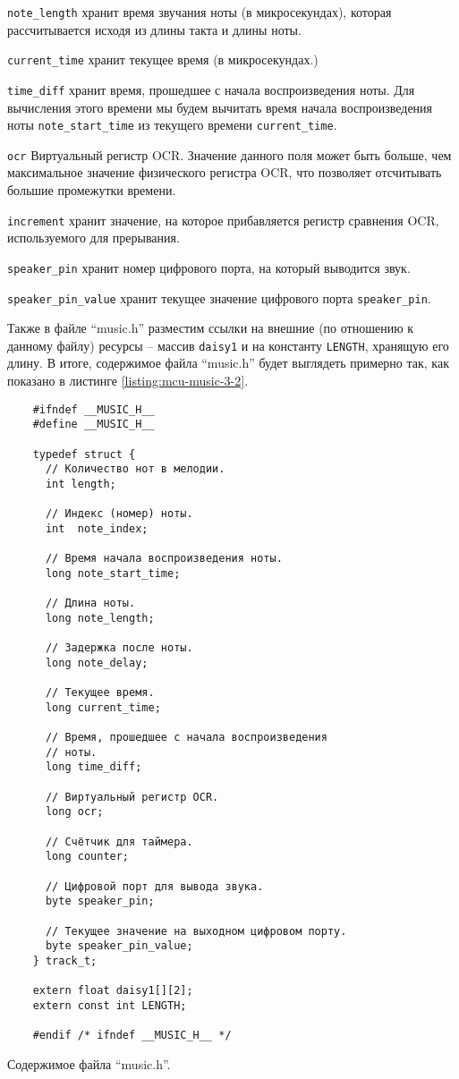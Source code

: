 \documentclass[../sparc.tex]{subfiles}
\begin{document}
\texttt{note_length} хранит время звучания ноты (в микросекундах),
которая рассчитывается исходя из длины такта и длины ноты.

\texttt{current_time} хранит текущее время (в микросекундах.)

\texttt{time_diff} хранит время, прошедшее с начала воспроизведения
ноты.  Для вычисления этого времени мы будем вычитать время начала
воспроизведения ноты \texttt{note_start_time} из текущего времени
\texttt{current_time}.

\texttt{ocr} Виртуальный регистр OCR.  Значение данного поля может быть
больше, чем максимальное значение физического регистра OCR, что позволяет
отсчитывать большие промежутки времени.

\texttt{increment} хранит значение, на которое прибавляется регистр
сравнения OCR, используемого для прерывания.

\texttt{speaker_pin} хранит номер цифрового порта, на который выводится
звук.

\texttt{speaker_pin_value} хранит текущее значение цифрового порта
\texttt{speaker_pin}.

Также в файле ``music.h'' разместим ссылки на внешние (по отношению к данному
файлу) ресурсы -- массив \texttt{daisy1} и на константу
\texttt{LENGTH}, хранящую его длину.  В итоге, содержимое файла
``music.h'' будет выглядеть примерно так, как показано в листинге
\ref{listing:mcu-music-3-2}.

\newpage
\begin{listing}[H]
  \begin{verbatim}
    #ifndef __MUSIC_H__
    #define __MUSIC_H__

    typedef struct {
      // Количество нот в мелодии.
      int length;

      // Индекс (номер) ноты.
      int  note_index;

      // Время начала воспроизведения ноты.
      long note_start_time;

      // Длина ноты.
      long note_length;

      // Задержка после ноты.
      long note_delay;

      // Текущее время.
      long current_time;

      // Время, прошедшее с начала воспроизведения
      // ноты.
      long time_diff;

      // Виртуальный регистр OCR.
      long ocr;

      // Счётчик для таймера.
      long counter;

      // Цифровой порт для вывода звука.
      byte speaker_pin;

      // Текущее значение на выходном цифровом порту.
      byte speaker_pin_value;
    } track_t;

    extern float daisy1[][2];
    extern const int LENGTH;

    #endif /* ifndef __MUSIC_H__ */
  \end{verbatim}
  \caption{Содержимое файла ``music.h''.}
  \label{listing:mcu-music-3-2}
\end{listing}
\end{document}
